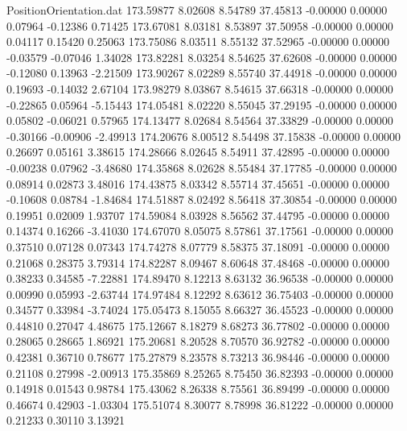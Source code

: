 \begin{filecontents}{PositionOrientation.dat}
 173.59877    8.02608    8.54789    37.45813   -0.00000    0.00000    0.07964   -0.12386    0.71425
 173.67081    8.03181    8.53897    37.50958   -0.00000    0.00000    0.04117    0.15420    0.25063
 173.75086    8.03511    8.55132    37.52965   -0.00000    0.00000   -0.03579   -0.07046    1.34028
 173.82281    8.03254    8.54625    37.62608   -0.00000    0.00000   -0.12080    0.13963   -2.21509
 173.90267    8.02289    8.55740    37.44918   -0.00000    0.00000    0.19693   -0.14032    2.67104
 173.98279    8.03867    8.54615    37.66318   -0.00000    0.00000   -0.22865    0.05964   -5.15443
 174.05481    8.02220    8.55045    37.29195   -0.00000    0.00000    0.05802   -0.06021    0.57965
 174.13477    8.02684    8.54564    37.33829   -0.00000    0.00000   -0.30166   -0.00906   -2.49913
 174.20676    8.00512    8.54498    37.15838   -0.00000    0.00000    0.26697    0.05161    3.38615
 174.28666    8.02645    8.54911    37.42895   -0.00000    0.00000   -0.00238    0.07962   -3.48680
 174.35868    8.02628    8.55484    37.17785   -0.00000    0.00000    0.08914    0.02873    3.48016
 174.43875    8.03342    8.55714    37.45651   -0.00000    0.00000   -0.10608    0.08784   -1.84684
 174.51887    8.02492    8.56418    37.30854   -0.00000    0.00000    0.19951    0.02009    1.93707
 174.59084    8.03928    8.56562    37.44795   -0.00000    0.00000    0.14374    0.16266   -3.41030
 174.67070    8.05075    8.57861    37.17561   -0.00000    0.00000    0.37510    0.07128    0.07343
 174.74278    8.07779    8.58375    37.18091   -0.00000    0.00000    0.21068    0.28375    3.79314
 174.82287    8.09467    8.60648    37.48468   -0.00000    0.00000    0.38233    0.34585   -7.22881
 174.89470    8.12213    8.63132    36.96538   -0.00000    0.00000    0.00990    0.05993   -2.63744
 174.97484    8.12292    8.63612    36.75403   -0.00000    0.00000    0.34577    0.33984   -3.74024
 175.05473    8.15055    8.66327    36.45523   -0.00000    0.00000    0.44810    0.27047    4.48675
 175.12667    8.18279    8.68273    36.77802   -0.00000    0.00000    0.28065    0.28665    1.86921
 175.20681    8.20528    8.70570    36.92782   -0.00000    0.00000    0.42381    0.36710    0.78677
 175.27879    8.23578    8.73213    36.98446   -0.00000    0.00000    0.21108    0.27998   -2.00913
 175.35869    8.25265    8.75450    36.82393   -0.00000    0.00000    0.14918    0.01543    0.98784
 175.43062    8.26338    8.75561    36.89499   -0.00000    0.00000    0.46674    0.42903   -1.03304
 175.51074    8.30077    8.78998    36.81222   -0.00000    0.00000    0.21233    0.30110    3.13921

\end{filecontents}
